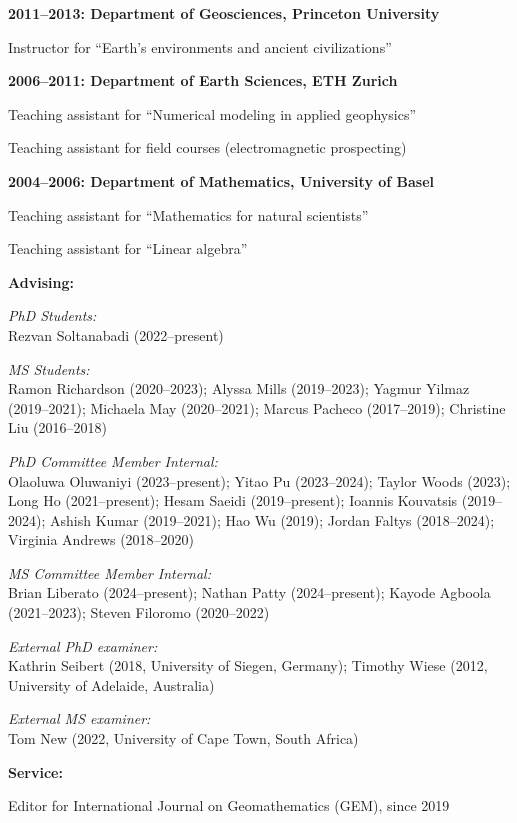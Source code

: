 \documentclass[10pt]{article}
\begin{document}
\spcp
\textbf{2011--2013:  Department of Geosciences, Princeton University}

Instructor for ``Earth's environments and ancient civilizations''

\spcp
\textbf{2006--2011: Department of Earth Sciences, ETH Zurich}

Teaching assistant for ``Numerical modeling in applied geophysics''
     
Teaching assistant for field courses (electromagnetic prospecting)

\spcp
\textbf{2004--2006: Department of Mathematics, University of Basel}

Teaching assistant for ``Mathematics for natural scientists''

Teaching assistant for ``Linear algebra''


\spc
\textbf{\tsize Advising:}

\spcp
\emph{PhD Students:}\\
Rezvan Soltanabadi (2022--present) 

\spcp
\emph{MS Students:}\\
Ramon Richardson (2020--2023); 
Alyssa Mills (2019--2023);
Yagmur Yilmaz (2019--2021);
Michaela May (2020--2021);
Marcus Pacheco (2017--2019);
Christine Liu (2016--2018) 

\spcp
\emph{PhD Committee Member Internal:}\\
Olaoluwa Oluwaniyi (2023--present);
Yitao Pu (2023--2024);
Taylor Woods (2023);
Long Ho (2021--present);
Hesam Saeidi (2019--present);
Ioannis Kouvatsis (2019--2024);
Ashish Kumar (2019--2021);
Hao Wu (2019);
Jordan Faltys (2018--2024);
Virginia Andrews (2018--2020)

\spcp
\emph{MS Committee Member Internal:}\\
Brian Liberato (2024--present);
Nathan Patty (2024--present);
Kayode Agboola (2021--2023);
Steven Filoromo (2020--2022) 

\spcp
\emph{External PhD examiner:}\\
Kathrin Seibert (2018, University of Siegen, Germany);
Timothy Wiese (2012, University of Adelaide, Australia)

\spcp
\emph{External MS examiner:}\\
Tom New (2022, University of Cape Town, South Africa)


\spc
\textbf{\tsize Service:}

\spcp
Editor for International Journal on Geomathematics (GEM), since 2019
\end{document}
